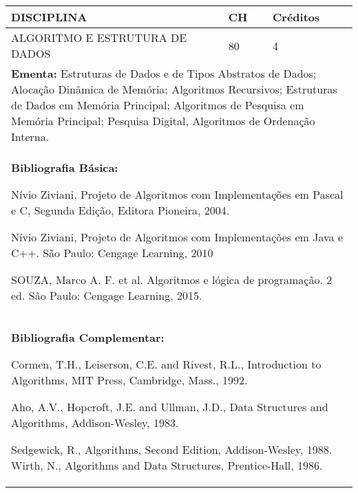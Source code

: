 \documentclass[a4paper, 12pt, openright, oneside, german, french, english, brazil]{abntex2}
\begin{document}
\begin{table}[!h]
  \footnotesize
  \centering
  \begin{tabular}{|p{100mm}|p{10mm}|p{20mm}|}
    \hline
    \textbf{DISCIPLINA} & \textbf{CH} & \textbf{Créditos} \\
    \hline
    ALGORITMO E ESTRUTURA DE DADOS  & 80 & 4 \\
    \hline
    \multicolumn{3}{|p{130mm}|}{\textbf{Ementa:} Estruturas de Dados e de Tipos Abstratos de Dados; Alocação Dinâmica de Memória; Algoritmos Recursivos; Estruturas de Dados em Memória Principal; Algoritmos de Pesquisa em Memória Principal; Pesquisa Digital, Algoritmos de Ordenação Interna. } \\
    \hline
    \multicolumn{3}{|p{130mm}|}{\textbf{Bibliografia Básica:}

    Nívio Ziviani, Projeto de Algoritmos com Implementações em Pascal e C, Segunda
Edição, Editora Pioneira, 2004.

Nívio Ziviani, Projeto de Algoritmos com Implementações em Java e C++. São Paulo:
Cengage Learning, 2010

SOUZA, Marco A. F. et al. Algoritmos e lógica de programação. 2 ed. São Paulo:
Cengage Learning, 2015.
} \\
    \hline
    \multicolumn{3}{|p{130mm}|}{\textbf{Bibliografia Complementar:}

    Cormen, T.H., Leiserson, C.E. and Rivest, R.L., Introduction to Algorithms, MIT Press, Cambridge, Mass., 1992.

Aho, A.V., Hopcroft, J.E. and Ullman, J.D., Data Structures and Algorithms, Addison-Wesley, 1983.

Sedgewick, R., Algorithms, Second Edition, Addison-Wesley, 1988. Wirth, N., Algorithms and Data Structures, Prentice-Hall, 1986.
} \\
    \hline
  \end{tabular}
\end{table}
\end{document}
